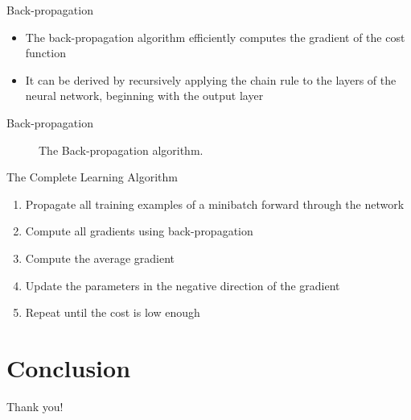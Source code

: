 \documentclass{beamer}
\begin{document}
	\begin{frame}{Back-propagation}
		\begin{itemize}
			\item <1-> The back-propagation algorithm efficiently computes the gradient of the cost function
			\item <2-> It can be derived by recursively applying the chain rule to the layers of the neural network, beginning with the output layer
		\end{itemize}
	\end{frame}
	\begin{frame}{Back-propagation}
		\begin{figure}
			\begin{center}
				
			\end{center}
			\caption{The Back-propagation algorithm.}
		\end{figure}
	\end{frame}
	\begin{frame}{The Complete Learning Algorithm}
		\begin{enumerate}
			\item <1-> Propagate all training examples of a minibatch forward through the network
			\item <2-> Compute all gradients using back-propagation
			\item <3-> Compute the average gradient
			\item <4-> Update the parameters in the negative direction of the gradient
			\item <5-> Repeat until the cost is low enough
		\end{enumerate}
	\end{frame}
	
	\section{Conclusion}
	\begin{frame}[standout]
		Thank you!
	\end{frame}
	
\end{document}
